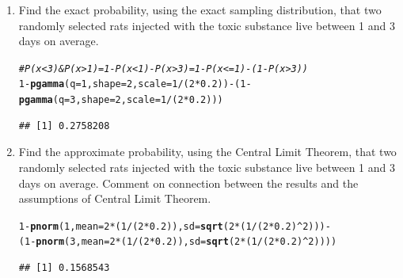 \documentclass{article}\usepackage[]{graphicx}\usepackage[]{color}
\makeatletter
\newcommand{\hlnum}[1]{\textcolor[rgb]{0.686,0.059,0.569}{#1}}%
\newcommand{\hlcom}[1]{\textcolor[rgb]{0.678,0.584,0.686}{\textit{#1}}}%
\newcommand{\hlopt}[1]{\textcolor[rgb]{0,0,0}{#1}}%
\newcommand{\hlstd}[1]{\textcolor[rgb]{0.345,0.345,0.345}{#1}}%
\newcommand{\hlkwc}[1]{\textcolor[rgb]{0.333,0.667,0.333}{#1}}%
\newcommand{\hlkwd}[1]{\textcolor[rgb]{0.737,0.353,0.396}{\textbf{#1}}}%
\newenvironment{kframe}{%
 \def\at@end@of@kframe{}%
 \ifinner\ifhmode%
  \def\at@end@of@kframe{\end{minipage}}%
  \begin{minipage}{\columnwidth}%
 \fi\fi%
 \def\FrameCommand##1{\hskip\@totalleftmargin \hskip-\fboxsep
 \colorbox{shadecolor}{##1}\hskip-\fboxsep
     \hskip-\linewidth \hskip-\@totalleftmargin \hskip\columnwidth}%
 \MakeFramed {\advance\hsize-\width
   \@totalleftmargin\z@ \linewidth\hsize
   \@setminipage}}%
 {\par\unskip\endMakeFramed%
 \at@end@of@kframe}
\newenvironment{knitrout}{}{} %
\makeatother
\begin{document}
\begin{enumerate}
\begin{enumerate}
	  \item Find the exact probability, using the exact sampling distribution, that two randomly selected rats injected with the toxic substance live  between 1 and 3 days on average.
\begin{knitrout}
\color{fgcolor}\begin{kframe}
\begin{alltt}
\hlcom{# P(x < 3) & P(x > 1) = 1-P(x<1)-P(x>3) = 1-P(x<=1)-(1-P(x>3))}
\hlnum{1}\hlopt{-}\hlkwd{pgamma}\hlstd{(}\hlkwc{q}\hlstd{=}\hlnum{1}\hlstd{,} \hlkwc{shape}\hlstd{=}\hlnum{2}\hlstd{,} \hlkwc{scale}\hlstd{=}\hlnum{1}\hlopt{/}\hlstd{(}\hlnum{2}\hlopt{*}\hlnum{0.2}\hlstd{))}\hlopt{-}\hlstd{(}\hlnum{1}\hlopt{-}\hlkwd{pgamma}\hlstd{(}\hlkwc{q}\hlstd{=}\hlnum{3}\hlstd{,} \hlkwc{shape}\hlstd{=}\hlnum{2}\hlstd{,} \hlkwc{scale}\hlstd{=}\hlnum{1}\hlopt{/}\hlstd{(}\hlnum{2}\hlopt{*}\hlnum{0.2}\hlstd{)))}
\end{alltt}
\begin{verbatim}
## [1] 0.2758208
\end{verbatim}
\end{kframe}
\end{knitrout}
  \item Find the approximate probability, using the Central Limit Theorem, that two randomly 
	  selected rats injected with the toxic substance live between 1 and 3 days on average. Comment
	  on connection between the results and the assumptions of Central Limit Theorem.
\begin{knitrout}
\color{fgcolor}\begin{kframe}
\begin{alltt}
\hlnum{1}\hlopt{-}\hlkwd{pnorm}\hlstd{(}\hlnum{1}\hlstd{,} \hlkwc{mean}\hlstd{=}\hlnum{2}\hlopt{*}\hlstd{(}\hlnum{1}\hlopt{/}\hlstd{(}\hlnum{2}\hlopt{*}\hlnum{0.2}\hlstd{)),} \hlkwc{sd}\hlstd{=}\hlkwd{sqrt}\hlstd{(}\hlnum{2}\hlopt{*}\hlstd{(}\hlnum{1}\hlopt{/}\hlstd{(}\hlnum{2}\hlopt{*}\hlnum{0.2}\hlstd{)}\hlopt{^}\hlnum{2}\hlstd{)))}\hlopt{-}
  \hlstd{(}\hlnum{1}\hlopt{-}\hlkwd{pnorm}\hlstd{(}\hlnum{3}\hlstd{,} \hlkwc{mean}\hlstd{=}\hlnum{2}\hlopt{*}\hlstd{(}\hlnum{1}\hlopt{/}\hlstd{(}\hlnum{2}\hlopt{*}\hlnum{0.2}\hlstd{)),} \hlkwc{sd}\hlstd{=}\hlkwd{sqrt}\hlstd{(}\hlnum{2}\hlopt{*}\hlstd{(}\hlnum{1}\hlopt{/}\hlstd{(}\hlnum{2}\hlopt{*}\hlnum{0.2}\hlstd{)}\hlopt{^}\hlnum{2}\hlstd{))))}
\end{alltt}
\begin{verbatim}
## [1] 0.1568543

\end{verbatim}
\end{kframe}
\end{knitrout}
\end{enumerate}
\end{enumerate}
\end{document}
